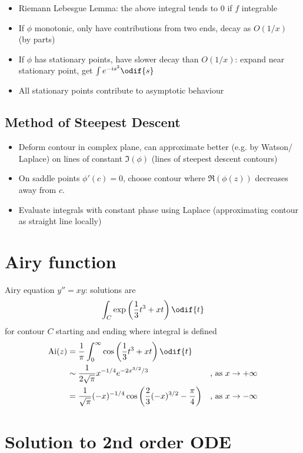 \begin{itemize}
    \item Riemann Lebesgue Lemma: the above integral tends to $0$ if $f$ integrable 
    \item If $\phi$ monotonic, only have contributions from two ends, decay as $O(1/x)$ (by parts)
    \item If $\phi$ has stationary points, have slower decay than $O(1/x)$: expand near stationary point, get $\int e^{-is^2} \odif{s}$
    \item All stationary points contribute to asymptotic behaviour
\end{itemize}
\subsection*{Method of Steepest Descent}
\begin{itemize}
    \item Deform contour in complex plane, can approximate better (e.g. by Watson/ Laplace) on lines of constant $\Im(\phi)$ (lines of steepest descent contours)
    \item On saddle points $\phi'(c)=0$, choose contour where $\Re(\phi(z))$ decreases away from $c$.
    \item Evaluate integrals with constant phase using Laplace (approximating contour as straight line locally) 
\end{itemize}
\section{Airy function}
Airy equation $y''=xy$: solutions are \[\int_C \exp\left(\frac{1}{3}t^3 + xt \right) \odif{t} \]
for contour $C$ starting and ending where integral is defined
\begin{align*}
    \text{Ai}(z) &= \frac{1}{\pi}\int_0^\infty \cos\left(\frac{1}{3}t^3 + xt \right) \odif{t} \\
     & \sim \frac{1}{2\sqrt{\pi}}x^{-1/4}e^{-2x^{3/2}/3} &\text{, as } x\to +\infty \\
     &= \frac{1}{\sqrt{\pi}} (-x)^{-1/4} \cos\left(\frac{2}{3}(-x)^{3/2} -\frac{\pi}{4}\right)  &\text{, as } x\to -\infty   
\end{align*}
\section{Solution to 2nd order ODE}
